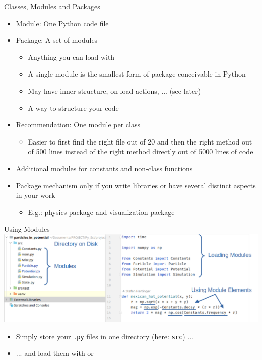 
\begin{frame}{Classes, Modules and Packages}
%
\begin{itemize}
\item Module: One Python code file
\item Package: A set of modules
	\begin{itemize}
	\item Anything you can load with 
	\item A single module is the smallest form of package conceivable in Python
	\item May have inner structure, on-load-actions, ... (see later)
	\item[\Thus] A way to structure your code
	\end{itemize}
\item Recommendation: One module per class
	\begin{itemize}
	\item Easier to first find the right file out of 20 and then the right method out of 500 lines instead of the right method directly out of 5000 lines of code
	\end{itemize}
\item Additional modules for constants and non-class functions
\item Package mechanism only if you write libraries or have several distinct aspects in your work
	\begin{itemize}
	\item E.\;g.: physics package and visualization package
	\end{itemize}
\end{itemize}
%
\end{frame}


\begin{frame}{Using Modules}
%
\includegraphics[width=\linewidth]{./gfx/01-modules}
%
\begin{itemize}
\item Simply store your \texttt{.py} files in one directory (here: \texttt{src}) ...
\item ... and load them with  or 
\end{itemize}
%
\end{frame}

